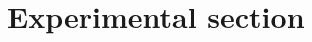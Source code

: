 \documentclass[../Master.tex]{subfiles}
\begin{document}
\chapter{Experimental section}
\end{document}

